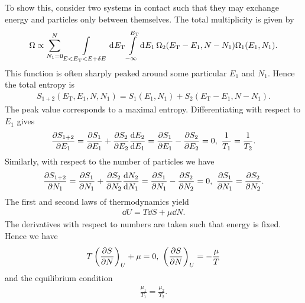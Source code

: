 To show this, consider two systems in contact such that they may exchange energy and particles only between themselves. The total multiplicity is given by
\begin{align*}
	\Omega \propto \sum\limits_{N_{1} = 0}^{N}\int\limits_{E < E_{\text{T}} < E + \delta E}^{}\dd[]{E_{\text{T}}}\int\limits_{-\infty}^{E_{\text{T}}}\dd[]{E_{1}}\Omega_{2}(E_{\text{T}} - E_{1}, N - N_{1})\Omega_{1}(E_{1}, N_{1}).
\end{align*}
This function is often sharply peaked around some particular $E_{1}$ and $N_{1}$. Hence the total entropy is
\begin{align*}
	S_{1 + 2}(E_{\text{T}}, E_{1}, N, N_{1}) = S_{1}(E_{1}, N_{1}) + S_{2}(E_{\text{T}} - E_{1}, N - N_{1}).
\end{align*}
The peak value corresponds to a maximal entropy. Differentiating with respect to $E_{1}$ gives
\begin{align*}
	\pdv{S_{1 + 2}}{E_{1}} = \pdv{S_{1}}{E_{1}} + \pdv{S_{2}}{E_{2}}\dv{E_{2}}{E_{1}} = \pdv{S_{1}}{E_{1}} - \pdv{S_{2}}{E_{2}} = 0,\ \frac{1}{T_{1}} = \frac{1}{T_{2}}.
\end{align*}
Similarly, with respect to the number of particles we have
\begin{align*}
	\pdv{S_{1 + 2}}{N_{1}} = \pdv{S_{1}}{N_{1}} + \pdv{S_{2}}{N_{2}}\dv{N_{2}}{N_{1}} = \pdv{S_{1}}{N_{1}} - \pdv{S_{2}}{N_{2}} = 0,\ \pdv{S_{1}}{N_{1}} = \pdv{S_{2}}{N_{2}}.
\end{align*}
The first and second laws of thermodynamics yield
\begin{align*}
	\dd{U} = T\dd{S} + \mu\dd{N}.
\end{align*}
The derivatives with respect to numbers are taken such that energy is fixed. Hence we have
\begin{align*}
	T\left(\pdv{S}{N}\right)_{U} + \mu = 0,\ \left(\pdv{S}{N}\right)_{U} = -\frac{\mu}{T}
\end{align*}
and the equilibrium condition
\begin{align*}
	\frac{\mu_{1}}{T_{1}} = \frac{\mu_{2}}{T_{2}}.
\end{align*}

